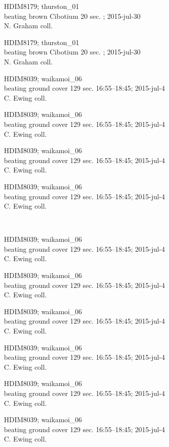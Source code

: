 \documentclass[2pt]{extarticle}
\begin{document}
\noindent
\parbox{0.16\textwidth}{\tiny \raggedright \rule[-0.3\baselineskip]{0pt}{10pt}HDIM8179; thurston\_01\\ beating brown Cibotium 20 sec. ; 2015-jul-30\\ N. Graham coll.}
\parbox{0.16\textwidth}{\tiny \raggedright \rule[-0.3\baselineskip]{0pt}{10pt}HDIM8179; thurston\_01\\ beating brown Cibotium 20 sec. ; 2015-jul-30\\ N. Graham coll.}
\parbox{0.16\textwidth}{\tiny \raggedright \rule[-0.3\baselineskip]{0pt}{10pt}HDIM8039; waikamoi\_06\\ beating ground cover 129 sec. 16:55--18:45; 2015-jul-4\\ C. Ewing coll.}
\parbox{0.16\textwidth}{\tiny \raggedright \rule[-0.3\baselineskip]{0pt}{10pt}HDIM8039; waikamoi\_06\\ beating ground cover 129 sec. 16:55--18:45; 2015-jul-4\\ C. Ewing coll.}
\parbox{0.16\textwidth}{\tiny \raggedright \rule[-0.3\baselineskip]{0pt}{10pt}HDIM8039; waikamoi\_06\\ beating ground cover 129 sec. 16:55--18:45; 2015-jul-4\\ C. Ewing coll.}
\parbox{0.16\textwidth}{\tiny \raggedright \rule[-0.3\baselineskip]{0pt}{10pt}HDIM8039; waikamoi\_06\\ beating ground cover 129 sec. 16:55--18:45; 2015-jul-4\\ C. Ewing coll.} \\ 
\vspace{0.001in} 

\noindent
\parbox{0.16\textwidth}{\tiny \raggedright \rule[-0.3\baselineskip]{0pt}{10pt}HDIM8039; waikamoi\_06\\ beating ground cover 129 sec. 16:55--18:45; 2015-jul-4\\ C. Ewing coll.}
\parbox{0.16\textwidth}{\tiny \raggedright \rule[-0.3\baselineskip]{0pt}{10pt}HDIM8039; waikamoi\_06\\ beating ground cover 129 sec. 16:55--18:45; 2015-jul-4\\ C. Ewing coll.}
\parbox{0.16\textwidth}{\tiny \raggedright \rule[-0.3\baselineskip]{0pt}{10pt}HDIM8039; waikamoi\_06\\ beating ground cover 129 sec. 16:55--18:45; 2015-jul-4\\ C. Ewing coll.}
\parbox{0.16\textwidth}{\tiny \raggedright \rule[-0.3\baselineskip]{0pt}{10pt}HDIM8039; waikamoi\_06\\ beating ground cover 129 sec. 16:55--18:45; 2015-jul-4\\ C. Ewing coll.}
\parbox{0.16\textwidth}{\tiny \raggedright \rule[-0.3\baselineskip]{0pt}{10pt}HDIM8039; waikamoi\_06\\ beating ground cover 129 sec. 16:55--18:45; 2015-jul-4\\ C. Ewing coll.}
\parbox{0.16\textwidth}{\tiny \raggedright \rule[-0.3\baselineskip]{0pt}{10pt}HDIM8039; waikamoi\_06\\ beating ground cover 129 sec. 16:55--18:45; 2015-jul-4\\ C. Ewing coll.} \\ 
\vspace{0.001in} 
\end{document}
